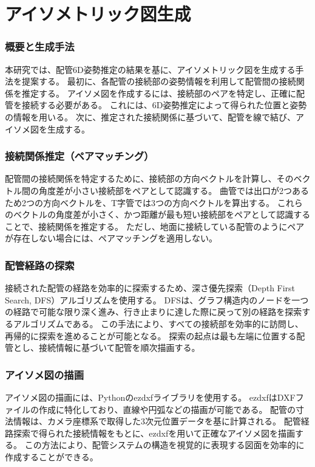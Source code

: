 \chapter{アイソメトリック図生成}

\subsection{概要と生成手法} 
本研究では、配管6D姿勢推定の結果を基に、アイソメトリック図を生成する手法を提案する。
最初に、各配管の接続部の姿勢情報を利用して配管間の接続関係を推定する。
アイソメ図を作成するには、接続部のペアを特定し、正確に配管を接続する必要がある。
これには、6D姿勢推定によって得られた位置と姿勢の情報を用いる。
次に、推定された接続関係に基づいて、配管を線で結び、アイソメ図を生成する。

\subsection{接続関係推定（ペアマッチング）} 
配管間の接続関係を特定するために、接続部の方向ベクトルを計算し、そのベクトル間の角度差が小さい接続部をペアとして認識する。
曲管では出口が2つあるため2つの方向ベクトルを、T字管では3つの方向ベクトルを算出する。
これらのベクトルの角度差が小さく、かつ距離が最も短い接続部をペアとして認識することで、接続関係を推定する。
ただし、地面に接続している配管のようにペアが存在しない場合には、ペアマッチングを適用しない。

\subsection{配管経路の探索} 
接続された配管の経路を効率的に探索するため、深さ優先探索（Depth First Search, DFS）アルゴリズムを使用する。
DFSは、グラフ構造内のノードを一つの経路で可能な限り深く進み、行き止まりに達した際に戻って別の経路を探索するアルゴリズムである。
この手法により、すべての接続部を効率的に訪問し、再帰的に探索を進めることが可能となる。
探索の起点は最も左端に位置する配管とし、接続情報に基づいて配管を順次描画する。

\subsection{アイソメ図の描画} 
アイソメ図の描画には、Pythonのezdxfライブラリを使用する。
ezdxfはDXFファイルの作成に特化しており、直線や円弧などの描画が可能である。
配管の寸法情報は、カメラ座標系で取得した3次元位置データを基に計算される。
配管経路探索で得られた接続情報をもとに、ezdxfを用いて正確なアイソメ図を描画する。
この方法により、配管システムの構造を視覚的に表現する図面を効率的に作成することができる。

